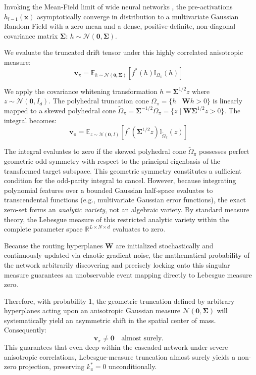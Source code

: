 \documentclass{article}
\newcommand{\E}{\mathbb{E}}
\newcommand{\R}{\mathbb{R}}
\newcommand{\1}{\mathbb{I}}
\newcommand{\bx}{\mathbf{x}}
\newcommand{\bv}{\mathbf{v}}
\newcommand{\bW}{\mathbf{W}}
\newcommand{\bSigma}{\boldsymbol{\Sigma}}
\newcommand{\calN}{\mathcal{N}}
\begin{document}
Invoking the Mean-Field limit of wide neural networks \citep{sirignano2020mean}, the pre-activations $h_{l-1}(\bx)$ asymptotically converge in distribution to a multivariate Gaussian Random Field with a zero mean and a dense, positive-definite, non-diagonal covariance matrix $\bSigma$: $h \sim \calN(\mathbf{0}, \bSigma)$.

We evaluate the truncated drift tensor under this highly correlated anisotropic measure:
\begin{equation}
    \bv_\pi = \E_{h \sim \calN(\mathbf{0}, \bSigma)} \left[ f^*(h) \1_{\Omega_\pi}(h) \right]
\end{equation}

We apply the covariance whitening transformation $h = \bSigma^{1/2} z$ where $z \sim \calN(\mathbf{0}, I_d)$. The polyhedral truncation cone $\Omega_\pi = \{ h \mid \bW h > 0 \}$ is linearly mapped to a skewed polyhedral cone $\tilde{\Omega}_\pi = \bSigma^{-1/2} \Omega_\pi = \{ z \mid \bW \bSigma^{1/2} z > 0 \}$. The integral becomes:
\begin{equation}
    \bv_\pi = \E_{z \sim \calN(\mathbf{0}, I)} \left[ f^*(\bSigma^{1/2} z) \1_{\tilde{\Omega}_\pi}(z) \right]
\end{equation}

The integral evaluates to zero if the skewed polyhedral cone $\tilde{\Omega}_\pi$ possesses perfect geometric odd-symmetry with respect to the principal eigenbasis of the transformed target subspace. This geometric symmetry constitutes a sufficient condition for the odd-parity integral to cancel. However, because integrating polynomial features over a bounded Gaussian half-space evaluates to transcendental functions (e.g., multivariate Gaussian error functions), the exact zero-set forms an \textit{analytic variety}, not an algebraic variety. By standard measure theory, the Lebesgue measure of this restricted analytic variety within the complete parameter space $\R^{L \times N \times d}$ evaluates to zero. 

Because the routing hyperplanes $\bW$ are initialized stochastically and continuously updated via chaotic gradient noise, the mathematical probability of the network arbitrarily discovering and precisely locking onto this singular measure guarantees an unobservable event mapping directly to Lebesgue measure zero.

Therefore, with probability 1, the geometric truncation defined by arbitrary hyperplanes acting upon an anisotropic Gaussian measure $\calN(\mathbf{0}, \bSigma)$ will systematically yield an asymmetric shift in the spatial center of mass. Consequently:
\begin{equation}
    \bv_\pi \neq \mathbf{0} \quad \text{almost surely.}
\end{equation}
This guarantees that even deep within the cascaded network under severe anisotropic correlations, Lebesgue-measure truncation almost surely yields a non-zero projection, preserving $k_\pi^* = 0$ unconditionally.
\end{document}
